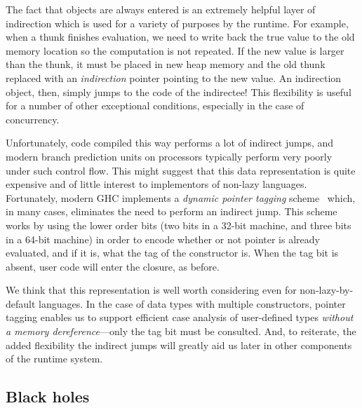 

The fact that objects are always entered is an extremely helpful layer
of indirection which is used for a variety of purposes by the runtime.
For example, when a thunk finishes evaluation, we need to write back the
true value to the old memory location so the computation is not
repeated.  If the new value is larger than the thunk, it must be placed
in new heap memory and the old thunk replaced with an \emph{indirection}
pointer pointing to the new value.  An indirection object, then, simply
jumps to the code of the indirectee!  This flexibility is useful for a
number of other exceptional conditions, especially in the case of
concurrency.

Unfortunately, code compiled this way performs a lot of indirect jumps,
and modern branch prediction units on processors typically perform very
poorly under such control flow.  This might suggest that this data
representation is quite expensive and of little interest to implementors
of non-lazy languages.  Fortunately, modern GHC implements a
\emph{dynamic pointer tagging} scheme~\XXX{} which, in many cases,
eliminates the need to perform an indirect jump.  This scheme works by
using the lower order bits (two bits in a 32-bit machine, and three bits
in a 64-bit machine) in order to encode whether or not pointer is
already evaluated, and if it is, what the tag of the constructor is.
When the tag bit is absent, user code will enter the closure, as before.

We think that this representation is well worth considering even for
non-lazy-by-default languages.  In the case of data types with multiple
constructors, pointer tagging enables us to support efficient case
analysis of user-defined types \emph{without a memory
dereference}---only the tag bit must be consulted.  And, to reiterate,
the added flexibility the indirect jumps will greatly aid us later in
other components of the runtime system.


\subsection{Black holes}

